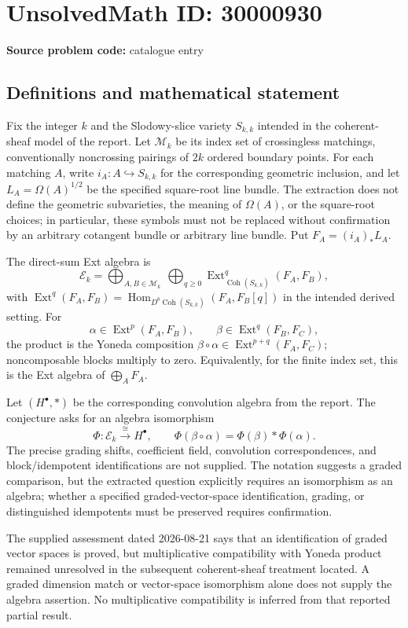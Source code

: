 \documentclass[11pt]{article}
\begin{document}
\section*{UnsolvedMath ID: 30000930}
\textbf{Source problem code:} catalogue entry
\subsection{Definitions and mathematical statement}
Fix the integer \(k\) and the Slodowy-slice variety \(S_{k,k}\) intended in the coherent-sheaf model of the report. Let \(\mathcal M_k\) be its index set of crossingless matchings, conventionally noncrossing pairings of \(2k\) ordered boundary points. For each matching \(A\), write \(i_A:A\hookrightarrow S_{k,k}\) for the corresponding geometric inclusion, and let \(L_A=\Omega(A)^{1/2}\) be the specified square-root line bundle. The extraction does not define the geometric subvarieties, the meaning of \(\Omega(A)\), or the square-root choices; in particular, these symbols must not be replaced without confirmation by an arbitrary cotangent bundle or arbitrary line bundle. Put \(F_A=(i_A)_*L_A\).

The direct-sum Ext algebra is
\[
 \mathcal E_k=\bigoplus_{A,B\in\mathcal M_k}\ \bigoplus_{q\geq0}
       \operatorname{Ext}^q_{\operatorname{Coh}(S_{k,k})}(F_A,F_B),
\]
with \(\operatorname{Ext}^q(F_A,F_B)=\operatorname{Hom}_{D^b\operatorname{Coh}(S_{k,k})}(F_A,F_B[q])\) in the intended derived setting. For
\[
 \alpha\in\operatorname{Ext}^p(F_A,F_B),\qquad
 \beta\in\operatorname{Ext}^q(F_B,F_C),
\]
the product is the Yoneda composition \(\beta\circ\alpha\in\operatorname{Ext}^{p+q}(F_A,F_C)\); noncomposable blocks multiply to zero. Equivalently, for the finite index set, this is the Ext algebra of \(\bigoplus_A F_A\).

Let \((H^\bullet,*)\) be the corresponding convolution algebra from the report. The conjecture asks for an algebra isomorphism
\[
 \Phi:\mathcal E_k\xrightarrow{\ \cong\ }H^\bullet,
 \qquad
 \Phi(\beta\circ\alpha)=\Phi(\beta)*\Phi(\alpha).
\]
The precise grading shifts, coefficient field, convolution correspondences, and block/idempotent identifications are not supplied. The notation suggests a graded comparison, but the extracted question explicitly requires an isomorphism as an algebra; whether a specified graded-vector-space identification, grading, or distinguished idempotents must be preserved requires confirmation.

The supplied assessment dated 2026-08-21 says that an identification of graded vector spaces is proved, but multiplicative compatibility with Yoneda product remained unresolved in the subsequent coherent-sheaf treatment located. A graded dimension match or vector-space isomorphism alone does not supply the algebra assertion. No multiplicative compatibility is inferred from that reported partial result.
\end{document}
